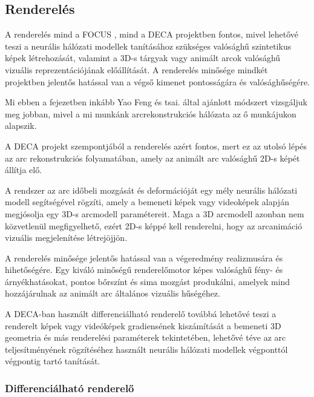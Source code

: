 \documentclass[12pt,a4]{article}
\begin{document}
              \newpage
              
        \subsection{Renderelés}

            A renderelés mind a FOCUS \cite{focus}, mind a DECA \cite{deca} projektben fontos, mivel lehetővé teszi a neurális hálózati modellek tanításához szükséges valósághű szintetikus képek létrehozását, valamint a 3D-s tárgyak vagy animált arcok valósághű vizuális reprezentációjának előállítását. A renderelés minősége mindkét projektben jelentős hatással van a végső kimenet pontosságára és valósághűségére.

            Mi ebben a fejezetben inkább Yao Feng és tsai. \cite{deca} által ajánlott módszert vizsgáljuk meg jobban, mivel a mi munkánk arcrekonstrukciós hálózata az ő munkájukon alapszik.

            A DECA projekt szempontjából a renderelés azért fontos, mert ez az utolsó lépés az arc rekonstrukciós folyamatában, amely az animált arc valósághű 2D-s képét állítja elő.

            A rendszer az arc időbeli mozgását és deformációját egy mély neurális hálózati modell segítségével rögzíti, amely a bemeneti képek vagy videoképek alapján megjósolja egy 3D-s arcmodell paramétereit. Maga a 3D arcmodell azonban nem közvetlenül megfigyelhető, ezért 2D-s képpé kell renderelni, hogy az arcanimáció vizuális megjelenítése létrejöjjön.
            
            A renderelés minősége jelentős hatással van a végeredmény realizmusára és hihetőségére. Egy kiváló minőségű renderelőmotor képes valósághű fény- és árnyékhatásokat, pontos bőrszínt és sima mozgást produkálni, amelyek mind hozzájárulnak az animált arc általános vizuális hűségéhez.
            
            A DECA-ban használt differenciálható renderelő továbbá lehetővé teszi a renderelt képek vagy videóképek gradiensének kiszámítását a bemeneti 3D geometria és más renderelési paraméterek tekintetében, lehetővé téve az arc teljesítményének rögzítéséhez használt neurális hálózati modellek végponttól végpontig tartó tanítását.

            \subsubsection{Differenciálható renderelő}
\end{document}

